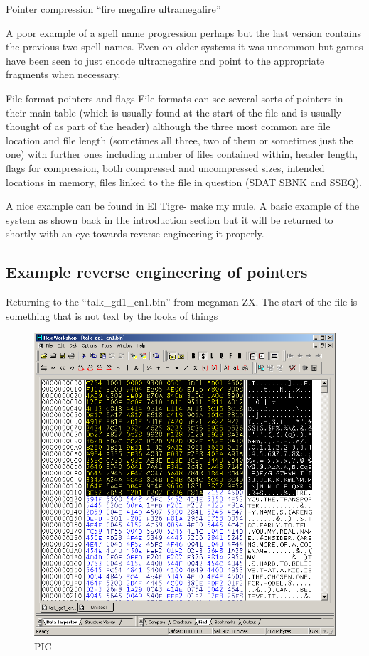 \documentclass[
]{book}
\begin{document}
Pointer compression ``fire megafire ultramegafire''

A poor example of a spell name progression perhaps but the last version contains the previous two spell names. Even on older systems it was uncommon but games have been seen to just encode ultramegafire and point to the appropriate fragments when necessary.

File format pointers and flags File formats can see several sorts of pointers in their main table (which is usually found at the start of the file and is usually thought of as part of the header) although the three most common are file location and file length (sometimes all three, two of them or sometimes just the one) with further ones including number of files contained within, header length, flags for compression, both compressed and uncompressed sizes, intended locations in memory, files linked to the file in question (SDAT SBNK and SSEQ).

A nice example can be found in El Tigre- make my mule. A basic example of the system as shown back in the introduction section but it will be returned to shortly with an eye towards reverse engineering it properly.

\hypertarget{example-reverse-engineering-of-pointers}{%
\subsection{Example reverse engineering of pointers}\label{example-reverse-engineering-of-pointers}}

Returning to the ``talk\_gd1\_en1.bin'' from megaman ZX. The start of the file is something that is not text by the looks of things

\begin{figure}
\centering
\includegraphics{images/101_home_fast6191_romhackingguide_unrenamed_fil___borders_romhackingguidepointersexamplehexw1.png}
\caption{PIC}
\end{figure}
\end{document}
